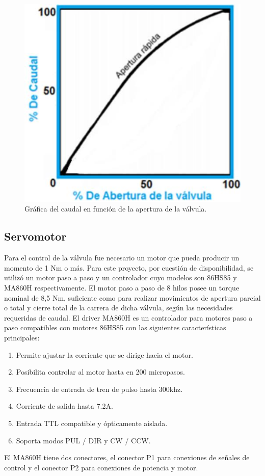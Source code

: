 \begin{figure}[h]
\centering
\includegraphics[scale=.50]{./Figures/funcion-valvula.jpeg}
\caption{Gráfica del caudal en función de la apertura de la válvula.}
\label{fig:grafica caudal vs. caudal}
\end{figure}

\subsection{Servomotor}
\label{subsec:Servomotor}
Para el control de la válvula fue necesario un motor que pueda producir un momento de 1 Nm o más. Para este proyecto, por cuestión de disponibilidad, se utilizó un motor paso a paso y un controlador cuyo modelos son 86HS85 y MA860H respectivamente.
El motor paso a paso de 8 hilos posee un torque nominal de 8,5 Nm, suficiente como para realizar movimientos de apertura parcial o total y cierre total de la carrera de dicha válvula, según las necesidades requeridas de caudal. 
El driver MA860H es un controlador para motores paso a paso compatibles con motores 86HS85 con las siguientes características principales:

\begin{enumerate}
	\item Permite ajustar la corriente que se dirige hacia el motor.
	\item Posibilita controlar al motor hasta en 200 micropasos.
	\item Frecuencia de entrada de tren de pulso hasta 300khz. 
	\item Corriente de salida hasta 7.2A.
	\item Entrada TTL compatible y ópticamente aislada.
	\item Soporta modos PUL / DIR y CW / CCW.
\end{enumerate}
El MA860H tiene dos conectores, el conector P1 para conexiones de señales de control y el conector P2 para conexiones de potencia y motor. 
